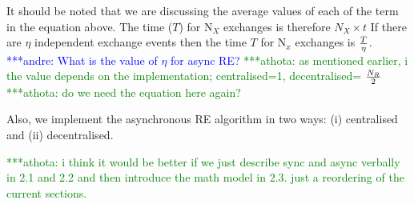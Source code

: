 \documentclass{rspublic}
\newcommand{\jhanote}[1]{ {\textcolor{red} { ***shantenu: #1 }}}
\newcommand{\alnote}[1]{ {\textcolor{blue} { ***andre: #1 }}}
\newcommand{\athotanote}[1]{ {\textcolor{green} { ***athota: #1 }}}
\newcommand{\alnote}[1]{}
\newcommand{\athotanote}[1]{}
\newcommand{\jhanote}[1]{}
\begin{document}
It should be noted that we are discussing the average values of each of the term in the equation above.
The time ($T$) for N$_{X}$ exchanges is therefore $N_{X} \times t$
If there are $\eta$ independent exchange events then the time $T$ for 
N$_x$ exchanges is $T \over \eta$. \alnote{What is the value of $\eta$ for async RE?} \athotanote{as mentioned earlier, i the value depends on the implementation; centralised=1, decentralised= $N_R\over2$}
\athotanote{do we need the equation here again?}

Also, we implement the asynchronous RE algorithm in two ways: (i) centralised and (ii) decentralised.

\athotanote{i think it would be better if we just describe sync and async verbally in 2.1 and 2.2 and then introduce the math model in 2.3. just a reordering of the current sections.}

  
\end{document}
